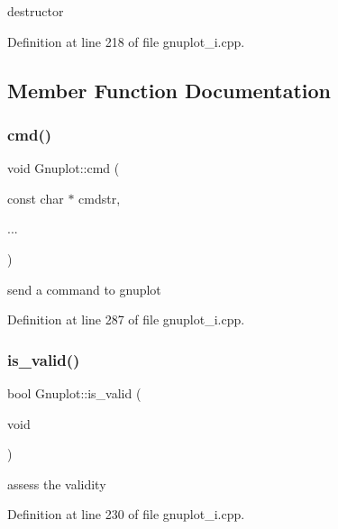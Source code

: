 destructor 



Definition at line 218 of file gnuplot\+\_\+i.\+cpp.



\subsection{Member Function Documentation}
\mbox{\label{class_gnuplot_a6f299285af0a0ee2cf1722c469aa1a57}} 
\subsubsection{\texorpdfstring{cmd()}{cmd()}}
{\footnotesize\ttfamily void Gnuplot\+::cmd (\begin{DoxyParamCaption}\item[{const char $\ast$}]{cmdstr,  }\item[{}]{... }\end{DoxyParamCaption})}



send a command to gnuplot 



Definition at line 287 of file gnuplot\+\_\+i.\+cpp.

\mbox{\label{class_gnuplot_a0daaf54cd8e41dbbd574722f3a831cfd}} 
\subsubsection{\texorpdfstring{is\+\_\+valid()}{is\_valid()}}
{\footnotesize\ttfamily bool Gnuplot\+::is\+\_\+valid (\begin{DoxyParamCaption}\item[{void}]{ }\end{DoxyParamCaption})}



assess the validity 



Definition at line 230 of file gnuplot\+\_\+i.\+cpp.

\mbox{\label{class_gnuplot_a55e6430f1329bf8a66f155dcacb9d112}} 
